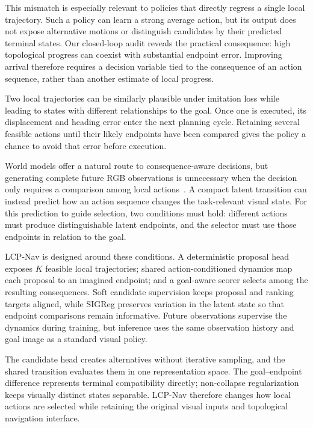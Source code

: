 \documentclass[conference]{IEEEtran}
\begin{document}
This mismatch is especially relevant to policies that directly regress a single local trajectory. Such a policy can learn a strong average action, but its output does not expose alternative motions or distinguish candidates by their predicted terminal states. Our closed-loop audit reveals the practical consequence: high topological progress can coexist with substantial endpoint error. Improving arrival therefore requires a decision variable tied to the consequence of an action sequence, rather than another estimate of local progress.

Two local trajectories can be similarly plausible under imitation loss while leading to states with different relationships to the goal. Once one is executed, its displacement and heading error enter the next planning cycle. Retaining several feasible actions until their likely endpoints have been compared gives the policy a chance to avoid that error before execution.

World models offer a natural route to consequence-aware decisions, but generating complete future RGB observations is unnecessary when the decision only requires a comparison among local actions~\cite{nwm,uniwm}. A compact latent transition can instead predict how an action sequence changes the task-relevant visual state. For this prediction to guide selection, two conditions must hold: different actions must produce distinguishable latent endpoints, and the selector must use those endpoints in relation to the goal.

LCP-Nav is designed around these conditions. A deterministic proposal head exposes $K$ feasible local trajectories; shared action-conditioned dynamics map each proposal to an imagined endpoint; and a goal-aware scorer selects among the resulting consequences. Soft candidate supervision keeps proposal and ranking targets aligned, while SIGReg preserves variation in the latent state so that endpoint comparisons remain informative. Future observations supervise the dynamics during training, but inference uses the same observation history and goal image as a standard visual policy.

The candidate head creates alternatives without iterative sampling, and the shared transition evaluates them in one representation space. The goal--endpoint difference represents terminal compatibility directly; non-collapse regularization keeps visually distinct states separable. LCP-Nav therefore changes how local actions are selected while retaining the original visual inputs and topological navigation interface.
\end{document}
